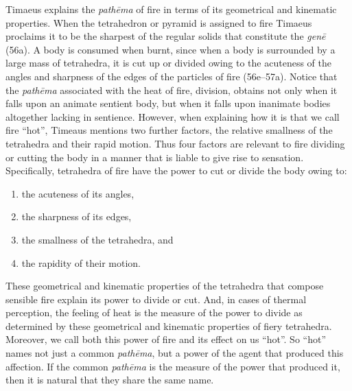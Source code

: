 Timaeus explains the \emph{pathēma} of fire in terms of its geometrical and kinematic properties. When the tetrahedron or pyramid is assigned to fire Timaeus proclaims it to be the sharpest of the regular solids that constitute the \emph{genē} (56a). A body is consumed when burnt, since when a body is surrounded by a large mass of tetrahedra, it is cut up or divided owing to the acuteness of the angles and sharpness of the edges of the particles of fire (56e--57a). Notice that the \emph{pathēma} associated with the heat of fire, division, obtains not only when it falls upon an animate sentient body, but when it falls upon inanimate bodies altogether lacking in sentience. However, when explaining how it is that we call fire ``hot'', Timeaus mentions two further factors, the relative smallness of the tetrahedra and their rapid motion. Thus four factors are relevant to fire dividing or cutting the body in a manner that is liable to give rise to sensation. Specifically, tetrahedra of fire have the power to cut or divide the body owing to:
\begin{enumerate}[(1)]
	\item the acuteness of its angles,
	\item the sharpness of its edges,
	\item the smallness of the tetrahedra, and
	\item the rapidity of their motion.
\end{enumerate}
These geometrical and kinematic properties of the tetrahedra that compose sensible fire explain its power to divide or cut. And, in cases of thermal perception, the feeling of heat is the measure of the power to divide as determined by these geometrical and kinematic properties of fiery tetrahedra. Moreover, we call both this power of fire and its effect on us ``hot''. So ``hot'' names not just a common \emph{pathēma}, but a power of the agent that produced this affection. If the common \emph{pathēma} is the measure of the power that produced it, then it is natural that they share the same name.


